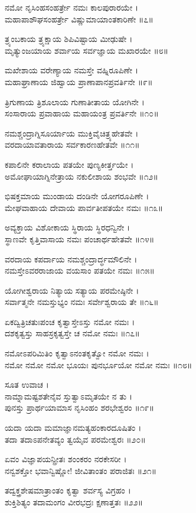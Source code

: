 ನಮೋ ನೃಸಿಂಹಸಂಹರ್ತ್ರೇ ನಮಃ ಕಾಲಪುರಾರಯೇ ।\\
ಮಹಾಪಾಶೌಘಸಂಹರ್ತ್ರೇ ವಿಷ್ಣುಮಾಯಾಂತಕಾರಿಣೇ ॥೭॥

ತ್ರ್ಯಂಬಕಾಯ ತ್ರ್ಯಕ್ಷಾಯ ಶಿಪಿವಿಷ್ಟಾಯ ಮೀಢುಷೇ ।\\
ಮೃತ್ಯುಂಜಯಾಯ ಶರ್ವಾಯ ಸರ್ವಜ್ಞಾಯ ಮಖಾರಯೇ ॥೮॥

ಮಖೇಶಾಯ ವರೇಣ್ಯಾಯ ನಮಸ್ತೇ ವಹ್ನಿರೂಪಿಣೇ ।\\
ಮಹಾಘ್ರಾಣಾಯ ಜಿಹ್ವಾಯ ಪ್ರಾಣಾಪಾನಪ್ರವರ್ತಿನೇ ॥೯॥

ತ್ರಿಗುಣಾಯ ತ್ರಿಶೂಲಾಯ ಗುಣಾತೀತಾಯ ಯೋಗಿನೇ ।\\
ಸಂಸಾರಾಯ ಪ್ರವಾಹಾಯ ಮಹಾಯಂತ್ರ ಪ್ರವರ್ತಿನೇ ॥೧೦॥

ನಮಶ್ಚಂದ್ರಾಗ್ನಿಸೂರ್ಯಾಯ ಮುಕ್ತಿವೈಚಿತ್ರ್ಯಹೇತವೇ ।\\
ವರದಾಯಾವತಾರಾಯ ಸರ್ವಕಾರಣಹೇತವೇ ॥೧೧॥

ಕಪಾಲಿನೇ ಕರಾಲಾಯ ಪತಯೇ ಪುಣ್ಯಕೀರ್ತ್ತಯೇ ।\\
ಅಮೋಘಾಯಾಗ್ನಿನೇತ್ರಾಯ ನಕುಲೀಶಾಯ ಶಂಭವೇ ॥೧೨॥

ಭಿಷಕ್ತಮಾಯ ಮುಂಡಾಯ ದಂಡಿನೇ ಯೋಗರೂಪಿಣೇ ।\\
ಮೇಘವಾಹಾಯ ದೇವಾಯ ಪಾರ್ವತೀಪತಯೇ ನಮಃ ॥೧೩॥

ಅವ್ಯಕ್ತಾಯ ವಿಶೋಕಾಯ ಸ್ಥಿರಾಯ ಸ್ಥಿರಧನ್ವಿನೇ ।\\
ಸ್ಥಾಣವೇ ಕೃತ್ತಿವಾಸಾಯ ನಮಃ ಪಂಚಾರ್ಥಹೇತವೇ ॥೧೪॥

ವರದಾಯ ಕಪರ್ದಾಯ ನಮಶ್ಚಂದ್ರಾರ್ದ್ಧಮೌಲಿನೇ ।\\
ನಮಸ್ತೇಽವರರಾಜಾಯ ವಯಸಾಂ ಪತಯೇ ನಮಃ ॥೧೫॥

ಯೋಗೀಶ್ವರಾಯ ನಿತ್ಯಾಯ ಸತ್ಯಾಯ ಪರಮೇಷ್ಠಿನೇ ।\\
ಸರ್ವಾತ್ಮನೇ ನಮಸ್ತುಭ್ಯಂ ನಮಃ ಸರ್ವೇಶ್ವರಾಯ ತೇ ॥೧೬॥

ಏಕದ್ವಿತ್ರಿಚತುಃಪಂಚ ಕೃತ್ವಾಸ್ತೇಽಸ್ತು ನಮೋ ನಮಃ ।\\
ದಶಕೃತ್ವಸ್ತು ಸಾಹಸ್ರಕೃತ್ವಸ್ತೇ ಚ ನಮೋ ನಮಃ ॥೧೭॥

ನಮೋಽಪರಿಮಿತಿಂ ಕೃತ್ವಾಽನಂತಕೃತ್ವೋ ನಮೋ ನಮಃ ।\\
ನಮೋ ನಮೋ ನಮೋ ಭೂಯಃ ಪುನರ್ಭೂಯೋ ನಮೋ ನಮಃ ॥೧೮॥

ಸೂತ ಉವಾಚ ।\\
ನಾಮ್ನಾಮಷ್ಟಶತೇನೈವ ಸ್ತುತ್ವಾಽಮೃತಯೇ ನ ತು ।\\
ಪುನಸ್ತು ಪ್ರಾರ್ಥಯಾಮಾಸ ನೃಸಿಂಹಂ ಶರಭೇಶ್ವರಂ ॥೧೯॥

ಯದಾ ಯದಾ ಮಮಾಜ್ಞಾನಮತ್ಯಹಂಕಾರದೂಷಿತಂ ।\\
ತದಾ ತದಾಽಪನೇತವ್ಯಂ ತ್ವಯೈವ ಪರಮೇಶ್ವರಃ ॥೨೦॥

ಏವಂ ವಿಜ್ಞಾಪಯನ್ಪ್ರೀತಃ ಶಂಂಕರಂ ನರಕೇಸರೀ ।\\
ನನ್ವಶಕ್ತೋ ಭವಾನ್ವಿಷ್ಣೋ! ಜೀವಿತಾಂತಂ ಪರಾಜಿತಃ ॥೨೧॥

ತದ್ವಕ್ತ್ರಶೇಷಮಾತ್ರಾಂತಂ ಕೃತ್ವಾ ಶರ್ವಸ್ಯ ವಿಗ್ರಹಂ ।\\
ಶುಕ್ತಿಶಿತ್ಯಂ ತದಾಮಂಗಂ ವೀರಭದ್ರಃ ಕ್ಷಣಾತ್ತತಃ ॥೨೨॥

